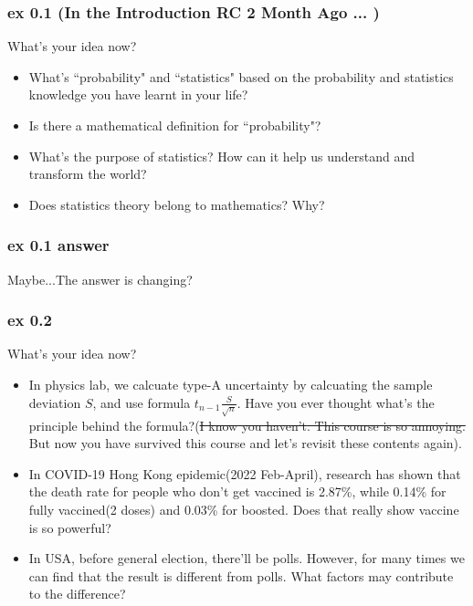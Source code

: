\documentclass{beamer}
\begin{document}
\begin{frame}
    \frametitle{ex 0.1 (In the Introduction RC 2 Month Ago ... )}
    What's your idea now?
    
    \begin{itemize}
        \item What's ``probability" and ``statistics" based on the probability and statistics knowledge you have learnt in your life?
        \item Is there a mathematical definition for ``probability"?
        \item What's the purpose of statistics? How can it help us understand and transform the world?
        \item Does statistics theory belong to mathematics? Why?
    \end{itemize}
    
\end{frame}

\begin{frame}
    \frametitle{ex 0.1 answer}

    Maybe...The answer is changing?

\end{frame}

\begin{frame}
    \frametitle{ex 0.2}

    What's your idea now?
    \begin{itemize}
    \item In physics lab, we calcuate type-A uncertainty by calcuating the sample deviation $S$, and use formula $t_{n-1}\frac{S}{\sqrt{n}}$. Have you ever thought what's the principle behind the formula?(\st{I know you haven't. This course is so annoying.} But now you have survived this course and let's revisit these contents again).
    \item In COVID-19 Hong Kong epidemic(2022 Feb-April), research has shown that the death rate for people who don't get vaccined is 2.87\%, while 0.14\% for fully vaccined(2 doses) and 0.03\% for boosted. Does that really show vaccine is so powerful?
    \item In USA, before general election, there'll be polls. However, for many times we can find that the result is different from polls. What factors may contribute to the difference?
    \end{itemize}
    
\end{frame}
\end{document}
